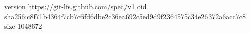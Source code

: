 version https://git-lfs.github.com/spec/v1
oid sha256:c8f71b4364f7cb7c6fd6dbe2c36ea692c5ed9d9f2364575c34e26372a6acc7c8
size 1048672
